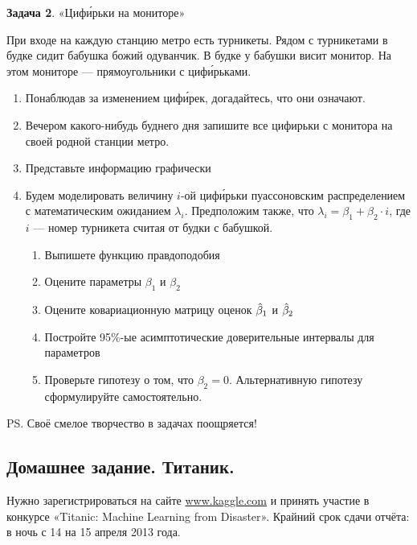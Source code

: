 \documentclass[12pt, a4paper]{article}\usepackage[]{graphicx}\usepackage[]{color}
\begin{document}
\textbf{Задача 2}. «Циф\'{и}рьки на мониторе»

При входе на каждую станцию метро есть турникеты. Рядом с турникетами в будке сидит бабушка божий одуванчик. В будке у бабушки висит монитор. На этом мониторе — прямоугольники с циф\'{и}рьками.
\begin{enumerate}
\item Понаблюдав за изменением циф\'{и}рек, догадайтесь, что они означают.
\item Вечером какого-нибудь буднего дня запишите все цифирьки с монитора на своей родной станции метро.
\item Представьте информацию графически
\item Будем моделировать величину $i$-ой циф\'{и}рьки пуассоновским распределением с математическим ожиданием $\lambda_i$. Предположим также, что $\lambda_i=\beta_1+\beta_2 \cdot i$, где $i$ — номер турникета считая от будки с бабушкой.
\begin{enumerate}
\item Выпишете функцию правдоподобия
\item Оцените параметры $\beta_1$ и $\beta_2$
\item Оцените ковариационную матрицу оценок $\hat{\beta}_1$ и $\hat{\beta}_2$
\item Постройте 95\%-ые асимптотические доверительные интервалы для параметров
\item Проверьте гипотезу о том, что $\beta_2=0$. Альтернативную гипотезу сформулируйте самостоятельно.
\end{enumerate}
\end{enumerate}



PS. Своё смелое творчество в задачах поощряется!

\subsection{Домашнее задание. Титаник.}

Нужно зарегистрироваться на сайте \url{www.kaggle.com} и принять участие в конкурсе «Titanic: Machine Learning from Disaster». Крайний срок сдачи отчёта: в ночь с 14 на 15 апреля 2013 года.

\vspace{15pt}
\WhiteRoseLine
\vspace{15pt}
\end{document}
